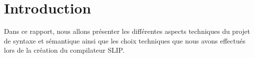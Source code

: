 \section{Introduction}

Dans ce rapport, nous allons présenter les différentes aspects techniques du projet de syntaxe et sémantique ainsi que les choix techniques que nous avons effectués lors de la création du compilateur SLIP.
